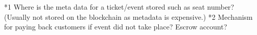 \begin{landscape}
\end{landscape}

*1 Where is the meta data for a ticket/event stored such as seat number? (Usually not stored on the blockchain as metadata is expensive.)
*2 Mechanism for paying back customers if event did not take place? Escrow account?